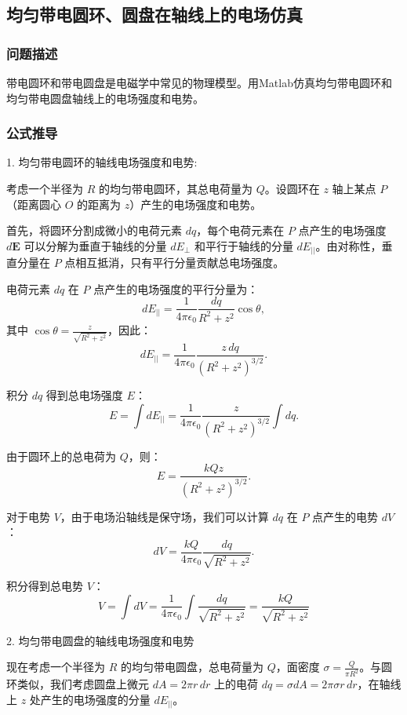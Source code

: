 \documentclass[UTF8]{article}
\numberwithin{figure}{subsection}
\numberwithin{table}{subsection}
\begin{document}
\begin{multicols}{2}
    \subsection{均匀带电圆环、圆盘在轴线上的电场仿真}
    \subsubsection{问题描述}
    \par 带电圆环和带电圆盘是电磁学中常见的物理模型。用Matlab仿真均匀带电圆环和均匀带电圆盘轴线上的电场强度和电势。
    \subsubsection{公式推导}
    \par 1. 均匀带电圆环的轴线电场强度和电势:
    \par 考虑一个半径为 \( R \) 的均匀带电圆环，其总电荷量为 \( Q \)。设圆环在 \( z \) 轴上某点 \( P \)（距离圆心 \( O \) 的距离为 \( z \)）产生的电场强度和电势。
    \par 首先，将圆环分割成微小的电荷元素 \( dq \)，每个电荷元素在 \( P \) 点产生的电场强度 \( d\mathbf{E} \) 可以分解为垂直于轴线的分量 \( dE_\perp \) 和平行于轴线的分量 \( dE_{||} \)。由对称性，垂直分量在 \( P \) 点相互抵消，只有平行分量贡献总电场强度。
    \par 电荷元素 \( dq \) 在 \( P \) 点产生的电场强度的平行分量为：
    \[ dE_{||} = \frac{1}{4\pi\epsilon_0} \frac{dq}{R^2+z^2} \cos\theta, \]
    其中 \( \cos\theta = \frac{z}{\sqrt{R^2+z^2}} \)，因此：
    \[ dE_{||} = \frac{1}{4\pi\epsilon_0} \frac{z \, dq}{(R^2+z^2)^{3/2}}. \]
    \par 积分 \( dq \) 得到总电场强度 \( E \)：
    \[ E = \int dE_{||} = \frac{1}{4\pi\epsilon_0} \frac{z}{(R^2+z^2)^{3/2}} \int dq. \]
    \par 由于圆环上的总电荷为 \( Q \)，则：
    \[ E = \frac{kQz}{(R^2+z^2)^{3/2}}. \]
    \par 对于电势 \( V \)，由于电场沿轴线是保守场，我们可以计算 \( dq \) 在 \( P \) 点产生的电势 \( dV \)：
    \[ dV = \frac{kQ}{4\pi\epsilon_0} \frac{dq}{\sqrt{R^2+z^2}}. \]
    \par 积分得到总电势 \( V \)：
    \[ V = \int dV = \frac{1}{4\pi\epsilon_0} \int \frac{dq}{\sqrt{R^2+z^2}} = \frac{kQ}{\sqrt{R^2+z^2}} \]
    \par 2. 均匀带电圆盘的轴线电场强度和电势
    \par 现在考虑一个半径为 \( R \) 的均匀带电圆盘，总电荷量为 \( Q \)，面密度 \( \sigma = \frac{Q}{\pi R^2} \)。与圆环类似，我们考虑圆盘上微元 \( dA = 2\pi r \, dr \) 上的电荷 \( dq = \sigma dA = 2\pi \sigma r \, dr \)，在轴线上 \( z \) 处产生的电场强度的分量 \( dE_{||} \)。
    

\end{multicols}
\end{document}
